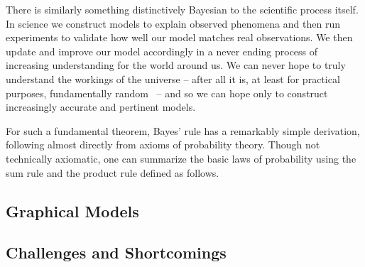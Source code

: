 There is similarly something distinctively Bayesian to the scientific process itself.  In science we construct models
to explain observed phenomena and then run experiments to validate how well our model matches
real observations.  We then update and improve our model accordingly in a never ending process of
increasing understanding for the world around us.  We can never hope to truly understand the workings
of the universe  -- after all it is, at least for practical purposes, fundamentally random~\citep{rainforth2013random} 
-- and so we can hope only to construct increasingly accurate and pertinent models.


For such a fundamental theorem, Bayes' rule has a remarkably simple derivation, following almost
directly from axioms of probability theory.  Though not technically axiomatic, one can summarize
the basic laws of probability using the sum rule and the product rule defined as follows.


\subsection{Graphical Models}

\subsection{Challenges and Shortcomings}